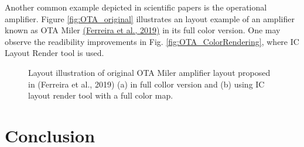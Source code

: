 \documentclass[10pt,a4paper,onecolumn]{article}
\begin{document}
Another common example depicted in scientific papers is the operational
amplifier. Figure \ref{fig:OTA_original} illustrates an layout example of an amplifier
known as OTA Miler \hyperlink{ref-Ferreira2019b}{(Ferreira et al., 2019)} in its full color version.
One may observe the readibility improvements in Fig. \ref{fig:OTA_ColorRendering}, where IC
Layout Render tool is used.
\begin{figure}
 \begin{center}
   \caption{Layout illustration of original OTA Miler amplifier layout
proposed in (Ferreira et al., 2019) (a) in full collor version and (b)
using IC layout render tool with a full color map.}
 \end{center}
\end{figure}


\hypertarget{conclusion}{%
\section{Conclusion}\label{conclusion}}
\end{document}
